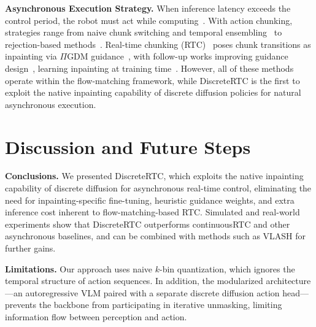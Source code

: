 \documentclass{article}
\begin{document}
\textbf{Asynchronous Execution Strategy.}
When inference latency exceeds the control period, the robot must act while computing~\citep{xiao2020thinking}.
With action chunking, strategies range from naive chunk switching and temporal ensembling~\citep{zhao2023learning} to rejection-based methods~\citep{liu2024bidirectional}.
Real-time chunking (RTC)~\citep{wang2026real} poses chunk transitions as inpainting via $\Pi$GDM guidance~\citep{song2023pseudoinverse}, with follow-up works improving guidance design~\citep{yang2026abpolicy}, learning inpainting at training time~\citep{black2025training, wang2026real, liu2026learning}.
However, all of these methods operate within the flow-matching framework, 
while DiscreteRTC is the first to exploit the native inpainting capability of discrete diffusion policies for natural asynchronous execution.




\section{Discussion and Future Steps}
\label{sec:conclusion}
\textbf{Conclusions.}
We presented DiscreteRTC, which exploits the native inpainting capability of discrete diffusion for asynchronous real-time control, eliminating the need for inpainting-specific fine-tuning, heuristic guidance weights, and extra inference cost inherent to flow-matching-based RTC.
Simulated and real-world experiments show that DiscreteRTC outperforms continuousRTC and other asynchronous baselines, and can be combined with methods such as VLASH for further gains.

\textbf{Limitations.}
Our approach uses naive $k$-bin quantization, which ignores the temporal structure of action sequences.
In addition, the modularized architecture---an autoregressive VLM paired with a separate discrete diffusion action head---prevents the backbone from participating in iterative unmasking, limiting information flow between perception and action.
\end{document}
